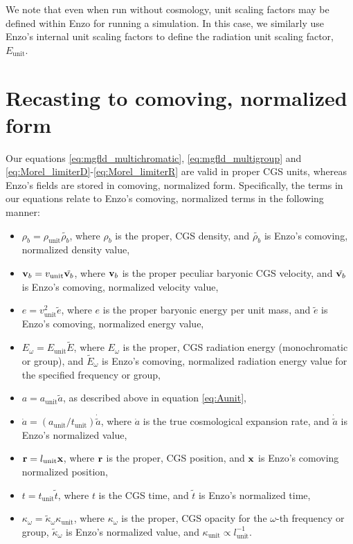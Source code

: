 \documentclass[10pt]{article}
\renewcommand{\(}{\left(}
\renewcommand{\)}{\right)}
\newcommand{\vb}{{\bf v}_b}
\newcommand{\xvec}{{\bf x}}
\newcommand{\rvec}{{\bf r}}
\newcommand{\adot}{\dot{a}}
\newcommand{\rhob}{\rho_b}
\newcommand{\Aunit}{a_{\text{unit}}}
\newcommand{\Lunit}{l_{\text{unit}}}
\newcommand{\Dunit}{\rho_{\text{unit}}}
\newcommand{\Tunit}{t_{\text{unit}}}
\newcommand{\Vunit}{v_{\text{unit}}}
\newcommand{\Eunit}{E_{\text{unit}}}
\newcommand{\Kunit}{\kappa_{\text{unit}}}
\newcommand{\tK}{\tilde{\kappa}}
\newcommand{\tT}{\tilde{t}}
\newcommand{\tE}{\tilde{E}}
\newcommand{\tRho}{\tilde{\rhob}}
\newcommand{\tA}{\tilde{a}}
\begin{document}
We note that even when run without cosmology, unit scaling factors may
be defined within Enzo for running a simulation.  In this case, we
similarly use Enzo's internal unit scaling factors to define the
radiation unit scaling factor, $\Eunit$. 





\section{Recasting to comoving, normalized form}
\label{sec:comoving_eqn}

Our equations \eqref{eq:mgfld_multichromatic},
\eqref{eq:mgfld_multigroup} and
\eqref{eq:Morel_limiterD}-\eqref{eq:Morel_limiterR} are valid in
proper CGS units, whereas Enzo's fields are stored in comoving,
normalized form.  Specifically, the terms in our equations relate to
Enzo's comoving, normalized terms in the following manner: 
\begin{itemize}
\item $\rhob = \Dunit \tRho$, where $\rhob$ is the proper, CGS
  density, and $\tRho$ is Enzo's comoving, normalized
  density value,
\item $\vb = \Vunit \tilde{\vb}$, where $\vb$ is the proper peculiar
  baryonic CGS velocity, and $\tilde{\vb}$ is Enzo's comoving,
  normalized velocity value,
\item $e = \Vunit^2 \tilde{e}$, where $e$ is the proper
  baryonic energy per unit mass, and $\tilde{e}$ is Enzo's comoving,
  normalized energy value,
\item $E_{\omega} = \Eunit \tE$, where $E_{\omega}$ is the proper, CGS radiation
  energy (monochromatic or group), and $\tE_{\omega}$ is Enzo's comoving,
  normalized radiation energy value for the specified frequency or
  group,
\item $a = \Aunit \tA$, as described above in equation
  \eqref{eq:Aunit},
\item $\adot = \left(\Aunit/\Tunit\right) \dot{\tA}$, where $\adot$ is
  the true cosmological expansion rate, and $\dot{\tA}$ is Enzo's
  normalized value,
\item $\rvec = \Lunit \xvec$, where $\rvec$ is the
  proper, CGS position, and $\xvec$ is Enzo's comoving normalized position,
\item $t = \Tunit \tT$, where $t$ is the CGS time, and $\tT$ is Enzo's
  normalized time,
\item $\kappa_{\omega} = \tK_{\omega} \Kunit$, where $\kappa_{\omega}$ is the proper, CGS
  opacity for the $\omega$-th frequency or group, $\tK_{\omega}$ is Enzo's
  normalized value, and $\Kunit \propto \Lunit^{-1}$.
\end{itemize}
\end{document}

